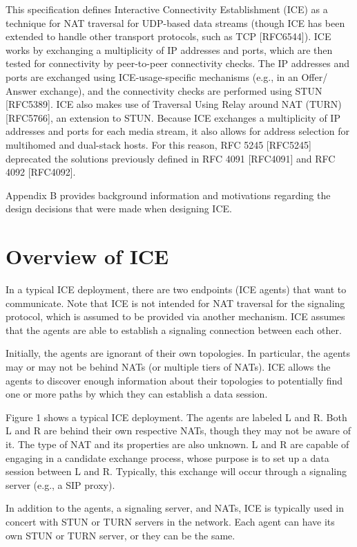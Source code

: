 \documentclass{article}
\begin{document}
This specification defines Interactive Connectivity Establishment (ICE) as a technique for NAT traversal for UDP-based data streams (though ICE has been extended to handle other transport protocols, such as TCP [RFC6544]).  ICE works by exchanging a multiplicity of IP addresses and ports, which are then tested for connectivity by peer-to-peer connectivity checks.  The IP addresses and ports are exchanged using ICE-usage-specific mechanisms (e.g., in an Offer/ Answer exchange), and the connectivity checks are performed using STUN [RFC5389].  ICE also makes use of Traversal Using Relay around NAT (TURN) [RFC5766], an extension to STUN.  Because ICE exchanges a multiplicity of IP addresses and ports for each media stream, it also allows for address selection for multihomed and dual-stack hosts. For this reason, RFC 5245 [RFC5245] deprecated the solutions previously defined in RFC 4091 [RFC4091] and RFC 4092 [RFC4092].

Appendix B provides background information and motivations regarding the design decisions that were made when designing ICE.

\section{Overview of ICE}

In a typical ICE deployment, there are two endpoints (ICE agents) that want to communicate.  Note that ICE is not intended for NAT traversal for the signaling protocol, which is assumed to be provided via another mechanism.  ICE assumes that the agents are able to establish a signaling connection between each other.

Initially, the agents are ignorant of their own topologies.  In particular, the agents may or may not be behind NATs (or multiple tiers of NATs).  ICE allows the agents to discover enough information about their topologies to potentially find one or more paths by which they can establish a data session.

Figure 1 shows a typical ICE deployment.  The agents are labeled L and R.  Both L and R are behind their own respective NATs, though they may not be aware of it.  The type of NAT and its properties are also unknown.  L and R are capable of engaging in a candidate exchange process, whose purpose is to set up a data session between L and R.  Typically, this exchange will occur through a signaling server (e.g., a SIP proxy).

In addition to the agents, a signaling server, and NATs, ICE is typically used in concert with STUN or TURN servers in the network. Each agent can have its own STUN or TURN server, or they can be the same.
\end{document}
